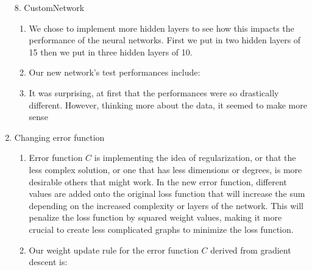 \documentclass[11pt]{article}
\begin{document}
\begin{enumerate}
8. CustomNetwork
\begin{enumerate}
\item We chose to implement more hidden layers to see how this impacts the performance of the neural networks. First we put in two hidden layers of 15 then we put in three hidden layers of 10. 
\item Our new network's test performances include:
\item It was surprising, at first that the performances were so drastically different. However, thinking more about the data, it seemed to make more sense 
\end{enumerate}
\item Changing error function
	\begin{enumerate}
	\item Error function $C$ is implementing the idea of regularization, or that the less complex solution, or one that has less dimensions or degrees, is more desirable others that might work. In the new error function, different values are added onto the original loss function that will increase the sum depending on the increased complexity or layers of the network. This will penalize the loss function by squared weight values, making it more crucial to create less complicated graphs to minimize the loss function. 
	\item Our weight update rule for the error function $C$ derived from gradient descent is:
	\end{enumerate}

\end{enumerate}
\end{document}
